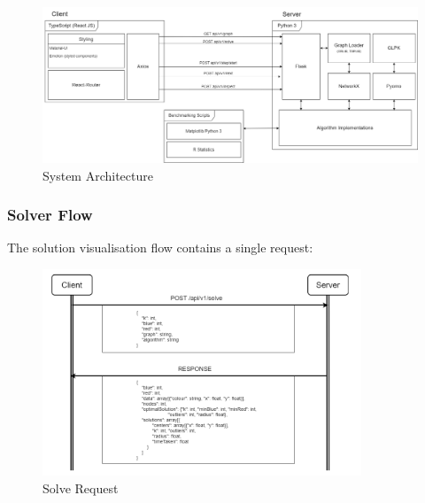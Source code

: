 \begin{figure}[H]
    \centering
    \includegraphics[width=\textwidth]{images/system_architecture.png}
    \caption{System Architecture}
    \label{fig:system_architecture}
\end{figure}

\subsubsection{Solver Flow}
The solution visualisation flow contains a single request:
\begin{figure}[H]
    \centering
    \includegraphics[width=0.85\textwidth]{images/solver_ui/post_solve_flow.png}
    \caption{Solve Request}
    \label{fig:solve_request}
\end{figure}

